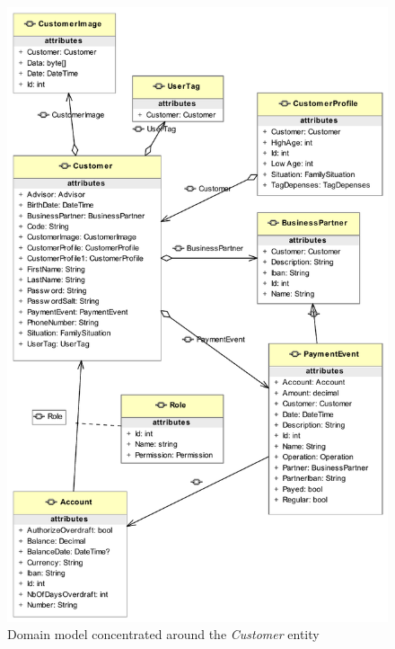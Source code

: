 \documentclass[11pt,twoside,a4paper]{book}
\begin{document}
\begin{figure}[h]
\begin{center}
\includegraphics[width=14cm]{figures/customer_oriented}
\caption{Domain model concentrated around the \textit{Customer} entity}
\label{fig:domain_model_1}
\end{center}
\end{figure}
\end{document}
